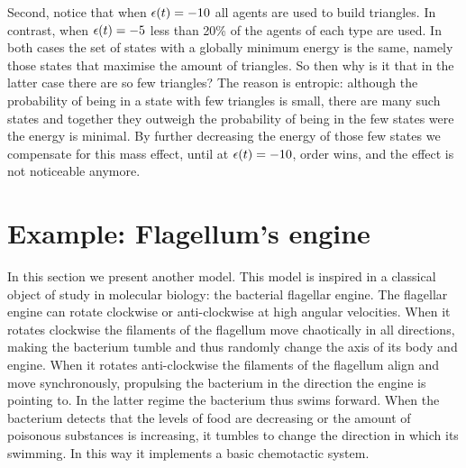Second, notice that %
when $\epsilon(t) = -10$ all agents are used to build triangles.
In contrast, when $\epsilon(t) = -5$ less than 20\%
of the agents of each type are used.
In both cases the set of states
with a globally minimum energy is the same,
namely those states that maximise the amount of triangles.
So then why is it that in the latter case there are so few triangles?
The reason is entropic:
although the probability of being in a state with few triangles is small,
there are many such states and together they outweigh
the probability of being in the few states were the energy is minimal.
By further decreasing the energy of those few states
we compensate for this mass effect,
until at $\epsilon(t) = -10$, order wins,
and the effect is not noticeable anymore.


\section{Example: Flagellum's engine}
\label{sec:alloring}

In this section we present another model.
This model is inspired in a classical
object of study in molecular biology:
the bacterial flagellar engine.
%
The flagellar engine can rotate clockwise or anti-clockwise
at high angular velocities.
When it rotates clockwise the filaments of the flagellum
move chaotically in all directions,
making the bacterium tumble %
and thus randomly change the axis %
of its body and engine.
When it rotates anti-clockwise
the filaments of the flagellum align
and move synchronously,
propulsing the bacterium in the direction
the engine is pointing to.
In the latter regime the bacterium thus swims forward.
When the bacterium detects that the levels of food are decreasing
or the amount of poisonous substances is increasing,
it tumbles to change the direction in which its swimming.
In this way it implements a basic chemotactic system.

